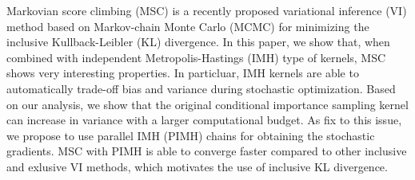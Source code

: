 
Markovian score climbing (MSC) is a recently proposed variational inference (VI) method based on Markov-chain Monte Carlo (MCMC) for minimizing the inclusive Kullback-Leibler (KL) divergence.
In this paper, we show that, when combined with independent Metropolis-Hastings (IMH) type of kernels, MSC shows very interesting properties.
In particluar, IMH kernels are able to automatically trade-off bias and variance during stochastic optimization.
Based on our analysis, we show that the original conditional importance sampling kernel can increase in variance with a larger computational budget.
As fix to this issue, we propose to use parallel IMH (PIMH) chains for obtaining the stochastic gradients.
MSC with PIMH is able to converge faster compared to other inclusive and exlusive VI methods, which motivates the use of inclusive KL divergence.


